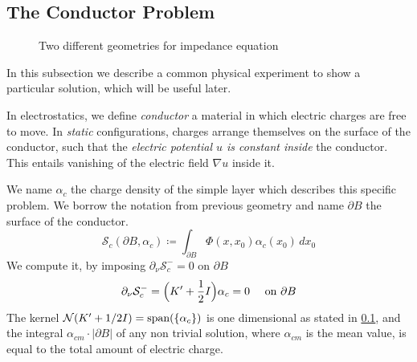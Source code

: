 \documentclass[10pt, a4paper, twoside, openright]{book}
\theoremstyle{definition}
\theoremstyle{plain}
\theoremstyle{plain}
\theoremstyle{plain}
\theoremstyle{plain}
\theoremstyle{plain}
\theoremstyle{plain}
\theoremstyle{plain}
\theoremstyle{plain}
\begin{document}
\subsection{The Conductor Problem}
\begin{figure}
\centering
{}
\caption{Two different geometries for impedance equation}
\label{fig:subfig}
\end{figure}
In this subsection we describe a common physical experiment to show a particular solution, which will be useful later.
\par
In electrostatics, we define \emph{conductor} a material in which electric charges are free to move. In \emph{static} configurations,
charges arrange themselves on the surface of the conductor, such that the \emph{electric potential $u$ is constant inside} the conductor. This entails vanishing of the electric field $\nabla u$ inside it.
\par
We name $\alpha_{c}$ the charge density of the simple layer which describes this specific problem. We borrow the notation from previous geometry and name $\partial B$ the surface of the conductor.
\begin{equation}
 \mathcal{S}_{c}(\partial B, \alpha_c)\coloneqq\int_{\partial B}\Phi(x,x_0)\alpha_{c}(x_0)\,dx_0
\end{equation}
We compute it, by imposing $\partial_\nu \mathcal{S}_{c}^- = 0$ on $\partial B$
\begin{equation}
 \partial_\nu\mathcal{S}_{c}^-=\Bigl(K'+\dfrac{1}{2}I\Bigr)\alpha_{c}= 0\quad\textup{ on }\partial B
\end{equation}
The kernel $\mathcal{N}(K' + 1/2 I)=\textup{span}(\{\alpha_{c}\})$ is one dimensional as stated in \ref{}, and the integral $\alpha_{cm} \cdot|\partial B|$ of any non trivial solution, where $\alpha_{cm}$ is the mean value, is equal to the total amount of electric charge.
\end{document}
